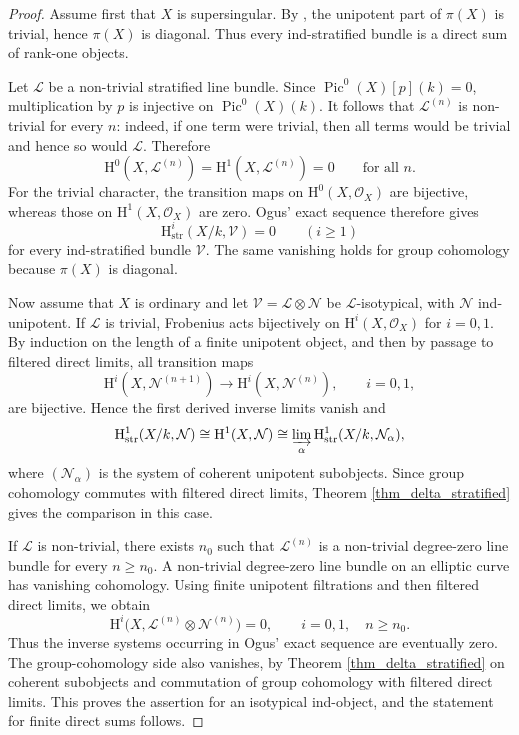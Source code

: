 \documentclass[12pt,a4]{amsart}
\theoremstyle{definition}
\begin{document}
\begin{proof}
Assume first that $X$ is supersingular. By \cite[Theorem~21]{dSa07}, the unipotent part of $\pi(X)$ is trivial, hence $\pi(X)$ is diagonal. Thus every ind-stratified bundle is a direct sum of rank-one objects.

Let $\mathcal L$ be a non-trivial stratified line bundle. Since $\operatorname{Pic}^0(X)[p](k)=0$, multiplication by $p$ is injective on $\operatorname{Pic}^0(X)(k)$. It follows that $\mathcal L^{(n)}$ is non-trivial for every $n$: indeed, if one term were trivial, then all terms would be trivial and hence so would $\mathcal L$. Therefore
\[
\mathrm H^0(X,\mathcal L^{(n)})=\mathrm H^1(X,\mathcal L^{(n)})=0
\qquad\text{for all }n.
\]
For the trivial character, the transition maps on $\mathrm H^0(X,\mathcal O_X)$ are bijective, whereas those on $\mathrm H^1(X,\mathcal O_X)$ are zero. Ogus' exact sequence \cite[Theorem~2.4]{Og75} therefore gives
\[
\mathrm H^i_{\mathrm{str}}(X/k,\mathcal V)=0\qquad(i\geq1)
\]
for every ind-stratified bundle $\mathcal V$. The same vanishing holds for group cohomology because $\pi(X)$ is diagonal.

Now assume that $X$ is ordinary and let $\mathcal V=\mathcal L\otimes\mathcal N$ be $\mathcal L$-isotypical, with $\mathcal N$ ind-unipotent. If $\mathcal L$ is trivial, Frobenius acts bijectively on $\mathrm H^i(X,\mathcal O_X)$ for $i=0,1$. By induction on the length of a finite unipotent object, and then by passage to filtered direct limits, all transition maps
\[
\mathrm H^i(X,\mathcal N^{(n+1)})\longrightarrow
\mathrm H^i(X,\mathcal N^{(n)}),\qquad i=0,1,
\]
are bijective. Hence the first derived inverse limits vanish and
\[
\mathrm H^1_{\mathrm{str}}(X/k,\mathcal N)
\cong \mathrm H^1(X,\mathcal N)
\cong \varinjlim_\alpha \mathrm H^1_{\mathrm{str}}(X/k,\mathcal N_\alpha),
\]
where $(\mathcal N_\alpha)$ is the system of coherent unipotent subobjects. Since group cohomology commutes with filtered direct limits, Theorem \ref{thm_delta_stratified} gives the comparison in this case.

If $\mathcal L$ is non-trivial, there exists $n_0$ such that $\mathcal L^{(n)}$ is a non-trivial degree-zero line bundle for every $n\geq n_0$. A non-trivial degree-zero line bundle on an elliptic curve has vanishing cohomology. Using finite unipotent filtrations and then filtered direct limits, we obtain
\[
\mathrm H^i\bigl(X,\mathcal L^{(n)}\otimes\mathcal N^{(n)}\bigr)=0,
\qquad i=0,1,\quad n\geq n_0.
\]
Thus the inverse systems occurring in Ogus' exact sequence \cite[Theorem~2.4]{Og75} are eventually zero. The group-cohomology side also vanishes, by Theorem \ref{thm_delta_stratified} on coherent subobjects and commutation of group cohomology with filtered direct limits. This proves the assertion for an isotypical ind-object, and the statement for finite direct sums follows.
\end{proof}
\end{document}
